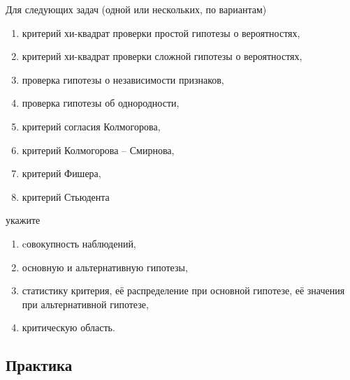 \documentclass[a4paper,12pt]{article}
\begin{document}
Для следующих задач (одной или нескольких, по вариантам)
\begin{enumerate}
      \item критерий хи-квадрат проверки простой гипотезы о вероятностях,
      \item критерий хи-квадрат проверки сложной гипотезы о вероятностях,
      \item проверка гипотезы о независимости признаков,
      \item проверка гипотезы об однородности,
      \item критерий согласия Колмогорова,
      \item критерий Колмогорова -- Смирнова,
      \item критерий Фишера,
      \item критерий Стьюдента
\end{enumerate}
укажите
\begin{enumerate}
      \item cовокупность наблюдений,
      \item основную и альтернативную гипотезы,
      \item статистику критерия, её распределение при основной гипотезе, её значения при альтернативной гипотезе,
      \item критическую область.
\end{enumerate}

\subsection*{Практика}
\end{document}
